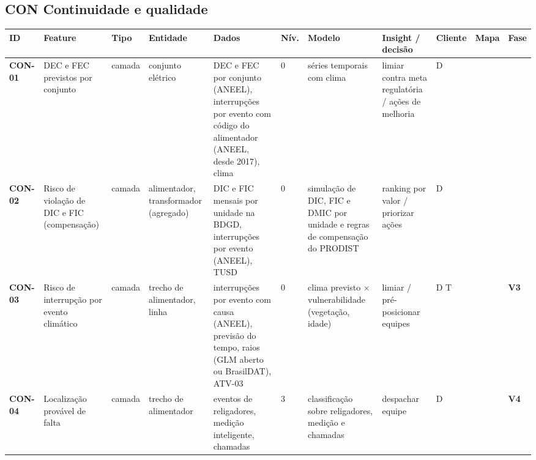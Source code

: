 \subsection*{CON \textperiodcentered{} Continuidade e qualidade}
\label{cat:CON}
{\footnotesize\setlength{\tabcolsep}{3pt}
\begin{longtable}{@{}P{1.35cm}P{4.1cm}P{1.3cm}P{3.1cm}P{3.7cm}C{0.6cm}P{3.6cm}P{3.3cm}P{1.1cm}P{0.9cm}P{1.1cm}@{}}
\toprule
\textbf{ID} & \textbf{Feature} & \textbf{Tipo} & \textbf{Entidade} & \textbf{Dados} & \textbf{Nív.} & \textbf{Modelo} & \textbf{Insight / decisão} & \textbf{Cliente} & \textbf{Mapa} & \textbf{Fase} \\
\midrule\endhead
\textbf{CON-01} & DEC e FEC previstos por conjunto & camada & conjunto elétrico & DEC e FEC por conjunto (ANEEL), interrupções por evento com código do alimentador (ANEEL, desde 2017), clima & 0 & séries temporais com clima & limiar contra meta regulatória / ações de melhoria & D &  & \colorbox{fV2}{\scriptsize \textcolor{white}{\textbf{V2}}} \\
\textbf{CON-02} & Risco de violação de DIC e FIC (compensação) & camada & alimentador, transformador (agregado) & DIC e FIC mensais por unidade na BDGD, interrupções por evento (ANEEL), TUSD & 0 & simulação de DIC, FIC e DMIC por unidade e regras de compensação do PRODIST & ranking por valor / priorizar ações & D &  & \colorbox{fV2}{\scriptsize \textcolor{white}{\textbf{V2}}} \\
\textbf{CON-03} & Risco de interrupção por evento climático & camada & trecho de alimentador, linha & interrupções por evento com causa (ANEEL), previsão do tempo, raios (GLM aberto ou BrasilDAT), ATV-03 & 0 & clima previsto $\times$ vulnerabilidade (vegetação, idade) & limiar / pré-posicionar equipes & D T &  & \colorbox{fV3}{\scriptsize \textbf{V3}} \\
\textbf{CON-04} & Localização provável de falta & camada & trecho de alimentador & eventos de religadores, medição inteligente, chamadas & 3 & classificação sobre religadores, medição e chamadas & despachar equipe & D &  & \colorbox{fV4}{\scriptsize \textbf{V4}} \\
\bottomrule
\end{longtable}}


